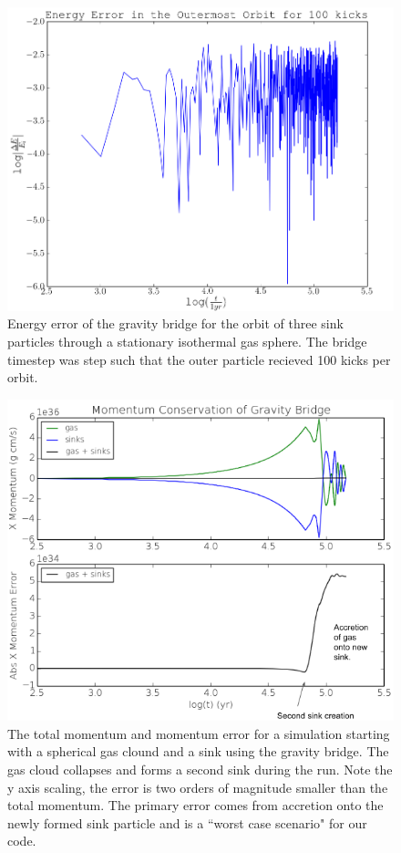 \documentclass[11pt]{article}
\begin{document}
\begin{figure}
\centering
\includegraphics[width=1.0\linewidth]{ener_mod}
\caption{Energy error of the gravity bridge for the orbit of three sink particles through a stationary isothermal gas sphere. The bridge timestep was step such that the outer particle recieved 100 kicks per orbit.}
\label{fig:ener}
\end{figure}

\begin{figure}
\hspace{-1.0cm}
\centering
\includegraphics[width=1.0\linewidth]{mom_mod}
\caption{The total momentum and momentum error for a simulation starting with a spherical gas clound and a sink using the gravity bridge. The gas cloud collapses and forms a second sink during the run. Note the y axis scaling, the error is two orders of magnitude smaller than the total momentum. The primary error comes from accretion onto the newly formed sink particle and is a ``worst case scenario" for our code.}
\label{fig:mommod}
\end{figure}
\end{document}
